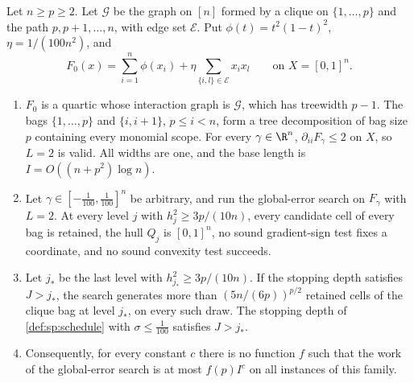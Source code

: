 \begin{theorem}\label{thm:lim:width}
Let $n\ge p\ge2$. Let $\mathcal G$ be the graph on $[n]$ formed by a
clique on $\{1,\ldots,p\}$ and the path $p,p+1,\ldots,n$, with edge set
$\mathcal E$. Put $\phi(t)=t^2(1-t)^2$, $\eta=1/(100n^2)$, and
\[
 F_0(x)=\sum_{i=1}^n\phi(x_i)+\eta\sum_{\{i,l\}\in\mathcal E}x_ix_l
 \qquad\text{on }X=[0,1]^n.
\]
\begin{enumerate}[label=(\alph*)]
\item\label{it:lim:width-instance} $F_0$ is a quartic whose interaction
graph is $\mathcal G$, which has treewidth $p-1$. The bags $\{1,\ldots,p\}$
and $\{i,i+1\}$, $p\le i<n$, form a tree decomposition of bag size $p$
containing every monomial scope. For every $\gamma\in\R^n$,
$\partial_{ii}F_\gamma\le2$ on $X$, so $L=2$ is valid. All widths are one,
and the base length is $I=O((n+p^2)\log n)$.
\item\label{it:lim:width-retain} Let $\gamma\in[-\frac1{100},\frac1{100}]^n$
be arbitrary, and run the global-error search on $F_\gamma$ with $L=2$. At
every level $j$ with $h_j^2\ge3p/(10n)$, every candidate cell of every bag
is retained, the hull $Q_j$ is $[0,1]^n$, no sound gradient-sign test fixes
a coordinate, and no sound convexity test succeeds.
\item\label{it:lim:width-count} Let $j_*$ be the last level with
$h_{j_*}^2\ge3p/(10n)$. If the stopping depth satisfies $J>j_*$, the search
generates more than $(5n/(6p))^{p/2}$ retained cells of the clique bag at
level $j_*$, on every such draw. The stopping depth of
\cref{def:sp:schedule} with $\sigma\le\frac1{100}$ satisfies $J>j_*$.
\item\label{it:lim:width-fpt} Consequently, for every constant $c$ there is
no function $f$ such that the work of the global-error search is at most
$f(p)I^c$ on all instances of this family.
\end{enumerate}
\end{theorem}

